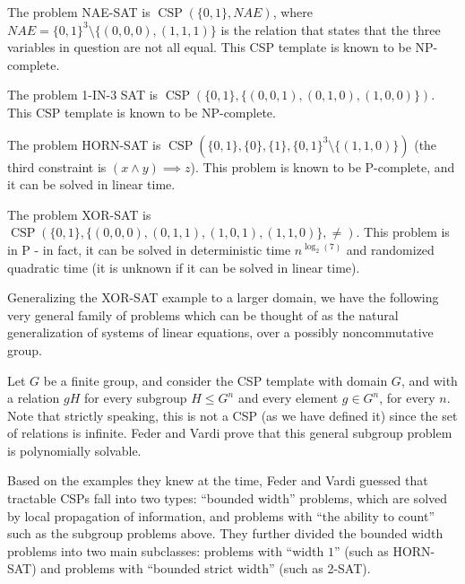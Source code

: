 \documentclass[letterpaper,11pt]{article}
\DeclareMathOperator{\CSP}{CSP}
\begin{document}
\begin{ex} The problem NAE-SAT is $\CSP(\{0,1\}, NAE)$, where $NAE = \{0,1\}^3 \setminus \{(0,0,0), (1,1,1)\}$ is the relation that states that the three variables in question are not all equal. This CSP template is known to be NP-complete.
\end{ex}

\begin{ex} The problem 1-IN-3 SAT is $\CSP(\{0,1\}, \{(0,0,1), (0,1,0), (1,0,0)\})$. This CSP template is known to be NP-complete.
\end{ex}

\begin{ex} The problem HORN-SAT is $\CSP(\{0,1\}, \{0\}, \{1\}, \{0,1\}^3\setminus\{(1,1,0)\})$ (the third constraint is $(x \wedge y) \implies z$). This problem is known to be P-complete, and it can be solved in linear time.
\end{ex}

\begin{ex} The problem XOR-SAT is $\CSP(\{0,1\}, \{(0,0,0), (0,1,1), (1,0,1), (1,1,0)\}, \ne)$. This problem is in P - in fact, it can be solved in deterministic time $n^{\log_2(7)}$ and randomized quadratic time \cite{sparse-systems} (it is unknown if it can be solved in linear time).
\end{ex}

Generalizing the XOR-SAT example to a larger domain, we have the following very general family of problems which can be thought of as the natural generalization of systems of linear equations, over a possibly noncommutative group.

\begin{ex} Let $G$ be a finite group, and consider the CSP template with domain $G$, and with a relation $gH$ for every subgroup $H \leq G^n$ and every element $g \in G^n$, for every $n$. Note that strictly speaking, this is not a CSP (as we have defined it) since the set of relations is infinite. Feder and Vardi \cite{feder-vardi} prove that this general subgroup problem is polynomially solvable.
\end{ex}

Based on the examples they knew at the time, Feder and Vardi guessed that tractable CSPs fall into two types: ``bounded width'' problems, which are solved by local propagation of information, and problems with ``the ability to count'' such as the subgroup problems above. They further divided the bounded width problems into two main subclasses: problems with ``width $1$'' (such as HORN-SAT) and problems with ``bounded strict width'' (such as 2-SAT).
\end{document}
